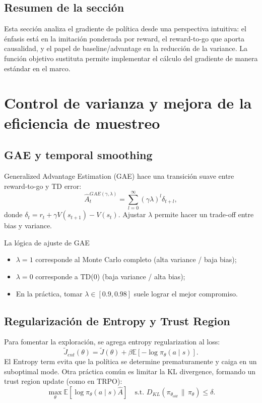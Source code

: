 \documentclass[a4paper]{article}
\begin{document}
\subsection{Resumen de la sección}

Esta sección analiza el gradiente de política desde una perspectiva intuitiva: el énfasis está en la imitación ponderada por reward, el reward-to-go que aporta causalidad, y el papel de baseline/advantage en la reducción de la variance. La función objetivo sustituta permite implementar el cálculo del gradiente de manera estándar en el marco.

\section{Control de varianza y mejora de la eficiencia de muestreo}
\subsection{GAE y temporal smoothing}
Generalized Advantage Estimation (GAE) hace una transición suave entre reward-to-go y TD error:
$$\hat{A}_t^{GAE(\gamma,\lambda)} = \sum_{l=0}^{\infty}(\gamma\lambda)^l \delta_{t+l},$$
donde $\delta_t = r_t + \gamma V(s_{t+1}) - V(s_t)$. Ajustar $\lambda$ permite hacer un trade-off entre bias y variance.

\begin{importantbox}{La lógica de ajuste de GAE}
\begin{itemize}
    \item $\lambda=1$ corresponde al Monte Carlo completo (alta variance / baja bias);
    \item $\lambda=0$ corresponde a TD(0) (baja variance / alta bias);
    \item En la práctica, tomar $\lambda \in [0.9,0.98]$ suele lograr el mejor compromiso.
\end{itemize}
\end{importantbox}

\subsection{Regularización de Entropy y Trust Region}
Para fomentar la exploración, se agrega entropy regularization al loss:
$$\tilde{J}_{ent}(\theta) = \tilde{J}(\theta) + \beta \mathbb{E}[-\log \pi_\theta(a\mid s)].$$
El Entropy term evita que la política se determine prematuramente y caiga en un suboptimal mode. Otra práctica común es limitar la KL divergence, formando un trust region update (como en TRPO):
$$\max_\theta \mathbb{E}[\log \pi_\theta(a\mid s) \hat{A}] \quad \text{s.t. } D_{KL}(\pi_{\theta_{old}} \,\|\, \pi_\theta) \le \delta.$$
\end{document}
